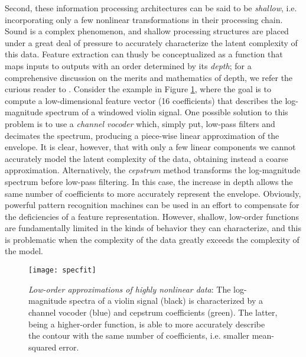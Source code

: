 Second, these information processing architectures can be said to be \emph{shallow}, i.e. incorporating only a few nonlinear transformations in their processing chain.
Sound is a complex phenomenon, and shallow processing structures are placed under a great deal of pressure to accurately characterize the latent complexity of this data.
Feature extraction can thusly be conceptualized as a function that maps inputs to outputs with an order determined by its \emph{depth}; for a comprehensive discussion on the merits and mathematics of depth, we refer the curious reader to \cite{Bengio2009Learning}.
Consider the example in Figure \ref{fig:curvefit}, where the goal is to compute a low-dimensional feature vector (16 coefficients) that describes the log-magnitude spectrum of a windowed violin signal.
One possible solution to this problem is to use a \emph{channel vocoder} which, simply put, low-pass filters and decimates the spectrum, producing a piece-wise linear approximation of the envelope.
It is clear, however, that with only a few linear components we cannot accurately model the latent complexity of the data, obtaining instead a coarse approximation.
Alternatively, the \emph{cepstrum} method transforms the log-magnitude spectrum before low-pass filtering.
In this case, the increase in depth allows the same number of coefficients to more accurately represent the envelope.
Obviously, powerful pattern recognition machines can be used in an effort to compensate for the deficiencies of a feature representation.
However, shallow, low-order functions are fundamentally limited in the kinds of behavior they can characterize, and this is problematic when the complexity of the data greatly exceeds the complexity of the model.

\begin{figure}[t]
\begin{centering}
\texttt{[image: specfit]}
\caption{\emph{Low-order approximations of highly nonlinear data}: The log-magnitude spectra of a violin signal (black) is characterized by a channel vocoder (blue) and cepstrum coefficients (green). The latter, being a higher-order function, is able to more accurately describe the contour with the same number of coefficients, i.e. smaller mean-squared error.}
\label{fig:curvefit}
\end{centering}
\end{figure}


